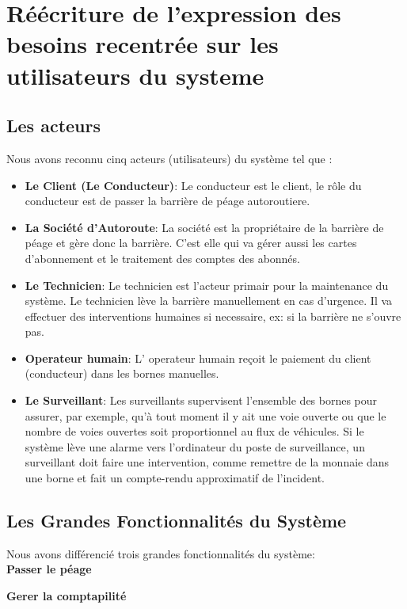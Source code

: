 \section{Réécriture de l'expression des besoins recentrée sur les utilisateurs du systeme}
\subsection{Les acteurs} 
Nous avons reconnu cinq acteurs (utilisateurs) du système tel que :
\begin{itemize}
    \item \textbf{Le Client (Le Conducteur)}: Le conducteur est le client, le rôle du conducteur est de passer la barrière de péage autoroutiere. 
    \item \textbf{La Société d’Autoroute}: 	La société est la propriétaire de la barrière de péage et gère donc la barrière. C’est elle qui va gérer aussi les cartes d’abonnement et le traitement des comptes des abonnés. 
    \item \textbf{Le Technicien}: Le technicien est l’acteur primair pour la maintenance du système. Le technicien lève la barrière manuellement en cas d’urgence. Il va effectuer des interventions humaines si necessaire, ex: si la barrière ne s’ouvre pas. 
    \item \textbf{Operateur humain}: L’ operateur humain reçoit le paiement du client (conducteur) dans les bornes manuelles.
    \item \textbf{Le Surveillant}: Les surveillants supervisent l’ensemble des bornes pour assurer, par exemple, qu’à tout moment il y ait une voie ouverte ou que le nombre de voies ouvertes soit proportionnel au flux de véhicules. Si le système lève une alarme vers l’ordinateur du poste de surveillance, un surveillant doit faire une intervention, comme remettre de la monnaie dans une borne et fait un compte-rendu approximatif de l’incident.
\end{itemize}
\newpage

\subsection{Les Grandes Fonctionnalités du Système}
Nous avons différencié trois grandes fonctionnalités du système:\\

\textbf{Passer le péage }%

\textbf{Gerer la comptapilité } %

